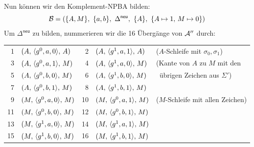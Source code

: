 \documentclass[fontsize=11pt, twoside=false, numbers=autoenddot]{scrbook}
\begin{document}
\begin{center}
\end{center}
%
Nun können wir den Komplement-NPBA \Bmc bilden:
\[
  \mathcal{B} = (\{A,M\},~ \{a,b\},~ \Delta^{\textsf{neu}},~ \{A\},~ \{A \mapsto 1,\,M \mapsto 0\})
\]
Um $\Delta^{\textsf{neu}}$ zu bilden, nummerieren wir die 16 Übergänge von $\mathcal{A}''$ durch:
%
\begin{center}
  \begin{tabular}{@{}rl@{\qquad}rl@{\qquad}l@{}}
     1 & $(A,\,\langle g^0,a,0\rangle,\,A)$ &  2 & $(A,\,\langle g^1,a,1\rangle,\,A)$ & ($A$-Schleife mit $\sigma_0,\sigma_1$)  \\[4pt]
     3 & $(A,\,\langle g^0,a,1\rangle,\,M)$ &  4 & $(A,\,\langle g^1,a,0\rangle,\,M)$ & (Kante von $A$ zu $M$ mit den   \\
     5 & $(A,\,\langle g^0,b,0\rangle,\,M)$ &  6 & $(A,\,\langle g^1,b,0\rangle,\,M)$ & ~übrigen Zeichen aus $\Sigma'$) \\
     7 & $(A,\,\langle g^0,b,1\rangle,\,M)$ &  8 & $(A,\,\langle g^1,b,1\rangle,\,M)$ & \\[4pt]
     9 & $(M,\,\langle g^0,a,0\rangle,\,M)$ & 10 & $(M,\,\langle g^0,a,1\rangle,\,M)$ & ($M$-Schleife mit allen Zeichen) \\
    11 & $(M,\,\langle g^0,b,0\rangle,\,M)$ & 12 & $(M,\,\langle g^0,b,1\rangle,\,M)$ & \\
    13 & $(M,\,\langle g^1,a,0\rangle,\,M)$ & 14 & $(M,\,\langle g^1,a,1\rangle,\,M)$ & \\
    15 & $(M,\,\langle g^1,b,0\rangle,\,M)$ & 16 & $(M,\,\langle g^1,b,1\rangle,\,M)$ &
  \end{tabular}
\end{center}
\end{document}
